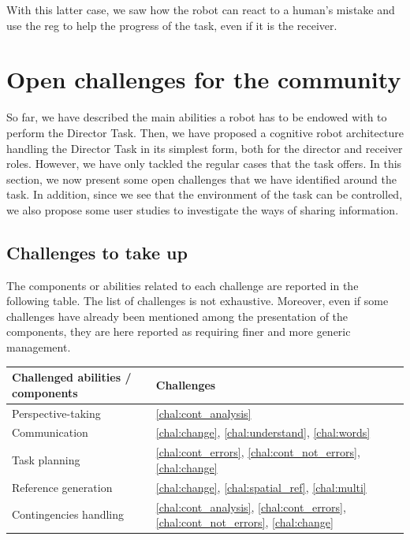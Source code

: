 With this latter case, we saw how the robot can react to a human's mistake and use the \acrshort{reg} to help the progress of the task, even if it is the receiver.

\section{Open challenges for the community}

So far, we have described the main abilities a robot has to be endowed with to perform the Director Task. Then, we have proposed a cognitive robot architecture handling the Director Task in its simplest form, both for the director and receiver roles. However, we have only tackled the regular cases that the task offers. In this section, we now present some open challenges that we have identified around the task. In addition, since we see that the environment of the task can be controlled, we also propose some user studies to investigate the ways of sharing information.

\subsection{Challenges to take up}

The components or abilities related to each challenge are reported in the following table. The list of challenges is not exhaustive. Moreover, even if some challenges have already been mentioned among the presentation of the components, they are here reported as requiring finer and more generic management.

\begin{center}
 \begin{tabular}{||l | l ||} 
 \hline
 Challenged abilities / components & Challenges \\ [0.5ex]
 \hline\hline
 Perspective-taking & \ref{chal:cont_analysis}  \\ 
 \hline
 Communication & \ref{chal:change}, \ref{chal:understand}, \ref{chal:words}\\
 \hline
 Task planning & \ref{chal:cont_errors}, \ref{chal:cont_not_errors}, \ref{chal:change} \\
 \hline
 Reference generation & \ref{chal:change}, \ref{chal:spatial_ref}, \ref{chal:multi} \\
 \hline
 Contingencies handling & \ref{chal:cont_analysis}, \ref{chal:cont_errors}, \ref{chal:cont_not_errors}, \ref{chal:change} \\ [1ex]
 \hline
\end{tabular}
\end{center}

